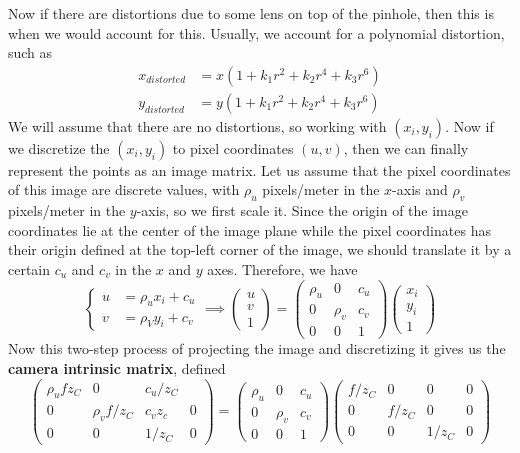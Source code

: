\documentclass{article}
\begin{document}
  Now if there are distortions due to some lens on top of the pinhole, then this is when we would account for this. Usually, we account for a polynomial distortion, such as 
  \begin{align*}
      x_{distorted} & = x (1 + k_1 r^2 + k_2 r^4 + k_3 r^6 ) \\
      y_{distorted} & = y (1 + k_1 r^2 + k_2 r^4 + k_3 r^6 )
  \end{align*}
  We will assume that there are no distortions, so working with $(x_i, y_i)$. Now if we discretize the $(x_i, y_i)$ to pixel coordinates $(u, v)$, then we can finally represent the points as an image matrix. Let us assume that the pixel coordinates of this image are discrete values, with $\rho_u$ pixels/meter in the $x$-axis and $\rho_v$ pixels/meter in the $y$-axis, so we first scale it. Since the origin of the image coordinates lie at the center of the image plane while the pixel coordinates has their origin defined at the top-left corner of the image, we should translate it by a certain $c_u$ and $c_v$ in the $x$ and $y$ axes. Therefore, we have 
  \begin{equation}
    \begin{cases} u & = \rho_u x_i + c_u \\ v & = \rho_V y_i + c_v \end{cases} \implies \begin{pmatrix} u \\ v \\ 1 \end{pmatrix} = \begin{pmatrix} \rho_u  & 0 & c_u \\ 0 & \rho_v & c_v \\ 0 & 0 & 1 \end{pmatrix} \begin{pmatrix} x_i \\ y_i \\ 1 \end{pmatrix}
  \end{equation}
  Now this two-step process of projecting the image and discretizing it gives us the \textbf{camera intrinsic matrix}, defined 
  \begin{equation}
    \begin{pmatrix} \rho_u f z_C & 0 & c_u / z_C \\
      0 & \rho_v f / z_C & c_v z_c & 0 \\
      0 & 0 & 1/z_C & 0 \end{pmatrix} = \begin{pmatrix} \rho_u  & 0 & c_u \\ 0 & \rho_v & c_v \\ 0 & 0 & 1 \end{pmatrix} \begin{pmatrix} f/z_C & 0 & 0 & 0 \\ 0 & f/z_C & 0 & 0 \\ 0 & 0 & 1/z_C & 0 \end{pmatrix}
  \end{equation}
\end{document}
